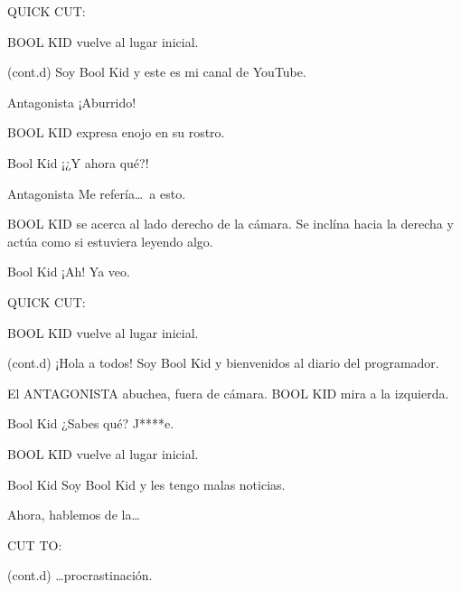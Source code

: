 \documentclass{screenplay}[2018/01/07]
\begin{document}
    \begin{flushright}
        QUICK CUT:
    \end{flushright}

    BOOL KID vuelve al lugar inicial.

    \begin{dialogue}{(cont.d)}
        Soy Bool Kid y este es mi canal de YouTube.
    \end{dialogue}

    \begin{dialogue}{Antagonista}
        ¡Aburrido!
    \end{dialogue}

    BOOL KID expresa enojo en su rostro.

    \begin{dialogue}{Bool Kid}
        ¡¿Y ahora qué?!
    \end{dialogue}

    \begin{dialogue}{Antagonista}
        Me refería\dots\ a esto.
    \end{dialogue}

    BOOL KID se acerca al lado derecho de la cámara. Se inclína hacia la derecha
    y actúa como si estuviera leyendo algo.

    \begin{dialogue}{Bool Kid}
        ¡Ah! Ya veo.
    \end{dialogue}

    \begin{flushright}
        QUICK CUT:
    \end{flushright}

    BOOL KID vuelve al lugar inicial.

    \begin{dialogue}{(cont.d)}
        ¡Hola a todos! Soy Bool Kid y bienvenidos al diario del programador.
    \end{dialogue}

    El ANTAGONISTA abuchea, fuera de cámara.
    BOOL KID mira a la izquierda.

    \begin{dialogue}[shouting]{Bool Kid}
        ¿Sabes qué? J****e.
    \end{dialogue}

    BOOL KID vuelve al lugar inicial.

    \begin{dialogue}{Bool Kid}
        Soy Bool Kid y les tengo malas noticias.

        Ahora, hablemos de la\dots
    \end{dialogue}

    \begin{flushright}
        CUT TO:
    \end{flushright}


    \begin{dialogue}{(cont.d)}
        \dots procrastinación.
    \end{dialogue}
    \fadeout

    \theend
\end{document}
